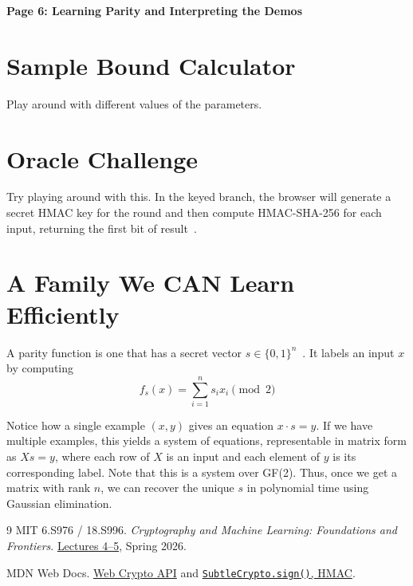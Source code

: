 \documentclass[11pt,fleqn]{article}
\begin{document}
\raggedright
\setlength{\parskip}{0.6em}

{\LARGE\bfseries Page 6: Learning Parity and Interpreting the Demos\par}
\medskip

\section{Sample Bound Calculator}

Play around with different values of the parameters.

\section{Oracle Challenge}

Try playing around with this. In the keyed branch, the browser will generate a secret HMAC key for the round and then compute HMAC-SHA-256 for each input, returning the first bit of result~\cite{mdn}.

\section{A Family We CAN Learn Efficiently}

A parity function is one that has a secret vector $s \in \{0, 1\}^n$~\cite{mit}. It labels an input $x$ by computing
\[f_s(x) = \sum_{i=1}^n s_i x_i \pmod 2\]

Notice how a single example $(x, y)$ gives an equation $x \cdot s = y$. If we have multiple examples, this yields a system of equations, representable in matrix form as $Xs = y$, where each row of $X$ is an input and each element of $y$ is its corresponding label. Note that this is a system over GF(2). Thus, once we get a matrix with rank $n$, we can recover the unique $s$ in polynomial time using Gaussian elimination.

\begin{thebibliography}{9}
MIT 6.S976 / 18.S996.
\emph{Cryptography and Machine Learning: Foundations and Frontiers}.
\href{https://mlcrypto.mit.edu/course/}{Lectures 4--5}, Spring 2026.

MDN Web Docs.
\href{https://developer.mozilla.org/en-US/docs/Web/API/Web_Crypto_API}
{Web Crypto API} and
\href{https://developer.mozilla.org/en-US/docs/Web/API/SubtleCrypto/sign#hmac}
{\texttt{SubtleCrypto.sign()}, HMAC}.
\end{thebibliography}
\end{document}

